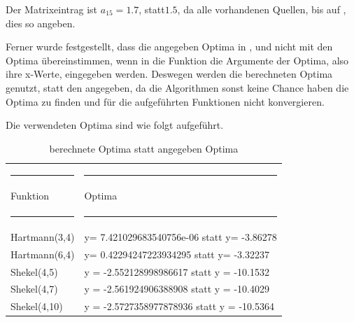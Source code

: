 \documentclass[fontsize=12, a4aper]{scrartcl}
\begin{document}
	Der Matrixeintrag ist \(a_{15}=1.7\), statt\(1.5\), da alle vorhandenen Quellen, bis auf \cite{socha2008ant}, dies so angeben.\hfill\newline
	
	Ferner wurde festgestellt, dass die angegeben Optima in \cite{testFunctionShekel}, \cite{testFunctionHartmann3} und \cite{testFunctionHartmann6} nicht mit den Optima übereinstimmen, wenn in die Funktion die Argumente der Optima, also ihre x-Werte, eingegeben werden. Deswegen werden die berechneten Optima genutzt, statt den angegeben, da die Algorithmen sonst keine Chance haben die Optima zu finden und für die aufgeführten Funktionen nicht konvergieren.\hfill\newline
	
	\noindent Die verwendeten Optima sind wie folgt aufgeführt.\hfill\newline
	
	\begin{table}[H]
		
		\fontsize{10pt}{12pt}
		
		\caption{berechnete Optima statt angegeben Optima}
		
		\label{berechneteOptima}
		
		\begin{tabularx}{\textwidth}{l|l}
			
			\rule{6cm}{0.4pt} & \rule{8.4cm}{0.4pt}\\
			
			Funktion & Optima\\
			
			\rule{6cm}{0.4pt} & \rule{8.4cm}{0.4pt}\\
			
			Hartmann(3,4) & y= 7.421029683540756e-06 statt y= -3.86278\\
			
			Hartmann(6,4) & y= 0.42294247223934295 statt y= -3.32237\\
			
			Shekel(4,5) & y = -2.552128998986617 statt y = -10.1532\\
			
			Shekel(4,7) & y = -2.561924906388908 statt y =  -10.4029\\
			
			Shekel(4,10) & y = -2.5727358977878936 statt y = -10.5364\\
			
		\end{tabularx}
		
	\end{table}
\end{document}
